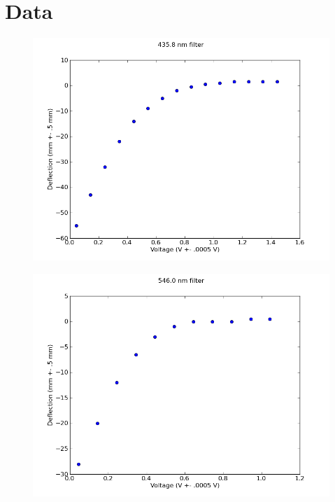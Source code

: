 \documentclass[12pt]{article}
\begin{document}
\section{Data}

\begin{figure}[H]
\centering
\hspace{-0.0in}\includegraphics[scale=0.50]{Plot1.png}
\end{figure}

\begin{figure}[H]
\centering
\hspace{-0.0in}\includegraphics[scale=0.50]{Plot2.png}
\end{figure}
\end{document}
